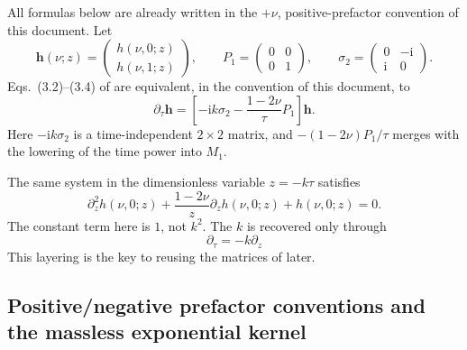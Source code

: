 \documentclass[11pt,a4paper]{article}
\newcommand{\ii}{\mathrm i}
\begin{document}
All formulas below are already written in the $+\nu$, positive-prefactor convention of this document. Let
\begin{equation}
 \bm h(\nu;z)=
 \begin{pmatrix}h(\nu,0;z)\\h(\nu,1;z)\end{pmatrix},
 \qquad
 P_1=\begin{pmatrix}0&0\\0&1\end{pmatrix},
 \qquad
 \sigma_2=\begin{pmatrix}0&-\ii\\ \ii&0\end{pmatrix}.
\end{equation}
Eqs.~(3.2)--(3.4) of \cite{Chen:2023eic} are equivalent, in the convention of this document, to
\begin{equation}
 \partial_\tau\bm h
 =\left[-\ii k\sigma_2-\frac{1-2\nu}{\tau}P_1\right]\bm h.
 \label{eq:h-first-order-system}
\end{equation}
Here $-\ii k\sigma_2$ is a time-independent $2\times2$ matrix, and $-(1-2\nu)P_1/\tau$ merges with the lowering of the time power into $M_1$.

The same system in the dimensionless variable $z=-k\tau$ satisfies
\begin{equation}
 \partial_z^2h(\nu,0;z)
 +\frac{1-2\nu}{z}\partial_zh(\nu,0;z)
 +h(\nu,0;z)=0.
 \label{eq:h-dimensionless-eom}
\end{equation}
The constant term here is $1$, not $k^2$. The $k$ is recovered only through
\begin{equation}
 \partial_\tau=-k\partial_z
 \label{eq:tau-z-chain}
\end{equation}
This layering is the key to reusing the matrices of \cite{Chen:2023eic} later.

\subsection{Positive/negative prefactor conventions and the massless exponential kernel}
\end{document}
